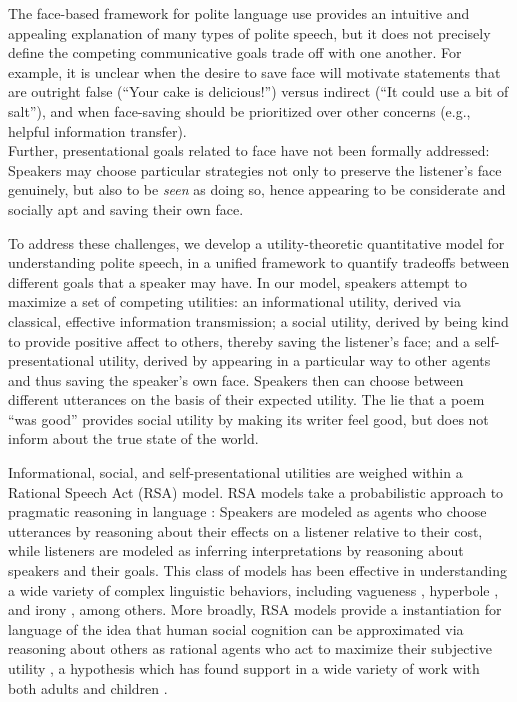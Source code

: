 \documentclass[12pt]{article}
\begin{document}
The face-based framework for polite language use provides an intuitive
and appealing explanation of many types of polite speech, but it does
not precisely define the competing communicative goals trade off with
one another. For example, it is unclear when the desire to save face
will motivate statements that are outright false (\enquote{Your cake is
delicious!}) versus indirect (\enquote{It could use a bit of salt}), and
when face-saving should be prioritized over other concerns (e.g.,
helpful information transfer).\\
Further, presentational goals related to face have not been formally
addressed: Speakers may choose particular strategies not only to
preserve the listener's face genuinely, but also to be \emph{seen} as
doing so, hence appearing to be considerate and socially apt and saving
their own face.


To address these challenges, we develop a utility-theoretic quantitative
model for understanding polite speech, in a unified framework to
quantify tradeoffs between different goals that a speaker may have. In
our model, speakers attempt to maximize a set of competing utilities: an
informational utility, derived via classical, effective information
transmission; a social utility, derived by being kind to provide
positive affect to others, thereby saving the listener's face; and a
self-presentational utility, derived by appearing in a particular way to
other agents and thus saving the speaker's own face. Speakers then can choose
between different utterances on the basis of their expected utility. The
lie that a poem \enquote{was good} provides social utility by making its
writer feel good, but does not inform about the true state of the world.

Informational, social, and self-presentational utilities are weighed
within a Rational Speech Act (RSA) model. RSA models take a
probabilistic approach to pragmatic reasoning in language \cite{frank2012, goodman2016}: 
Speakers are modeled as agents
who choose utterances by reasoning about their effects on a listener
relative to their cost, while listeners are modeled as inferring
interpretations by reasoning about speakers and their goals. This class
of models has been effective in understanding a wide variety of complex
linguistic behaviors, including vagueness \cite{lassiter2017adjectival},
hyperbole \cite{kao2014}, and irony \cite{kao2015}, among others. 
More broadly, RSA models provide a
instantiation for language of the idea that human social cognition can
be approximated via reasoning about others as rational agents who act to
maximize their subjective utility \cite{baker2009action}, a
hypothesis which has found support in a wide variety of work with both
adults and children \cite{jara2016naive, liu2017ten}.
\end{document}
